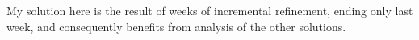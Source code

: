 \begin{comment}
Since my solution got rather long after I added some commentary I'll
post it separately in a couple of days, rather than double the size of
this post.

Michael Downes %
mjd@math.ams.org (Internet) ASCII 32--54,55--126: !"#$%
789:;<=>?@ABCDEFGHIJKLMNOPQRSTUVWXYZ[\]^_`abcdefghijklmnopqrstuvwxyz{|}~

Date: 03 Jan 1994 17:14:14 -0500 (EST)
From: Michael Downes <MJD@MATH.AMS.ORG>
Subject: Around the Bend #15, answers, 4th (last) installment
To: info-tex@shsu.edu
X-ListName: TeX-Related Network Discussion List <INFO-TeX@SHSU.edu>
\end{comment}

My solution here is the result of weeks of incremental refinement,
ending only last week, and consequently benefits from analysis of the
other solutions.

